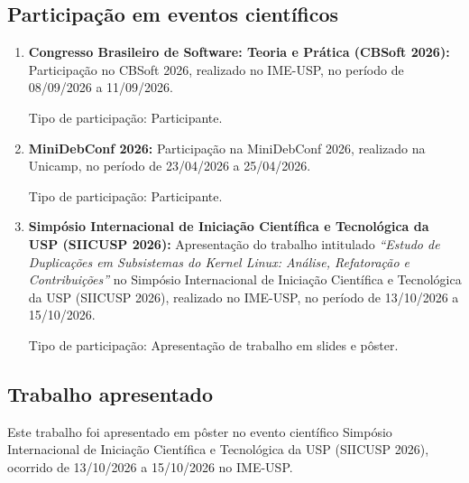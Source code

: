 \documentclass[oneside]{abntlatex}
\begin{document}
\begin{appendixenv}

\section{Participação em eventos científicos}\label{apx:participacao-em-eventos-cientificos}

\begingroup
\renewcommand{\labelenumi}{(\alph{enumi})}
\begin{enumerate}
    \item \textbf{Congresso Brasileiro de Software: Teoria e Prática (CBSoft 2026):} Participação no CBSoft 2026, realizado no IME-USP, no período de 08/09/2026 a 11/09/2026.

    Tipo de participação: Participante.

    \item \textbf{MiniDebConf 2026:} Participação na MiniDebConf 2026, realizado na Unicamp, no período de 23/04/2026 a 25/04/2026.

    Tipo de participação: Participante.

    \item \textbf{Simpósio Internacional de Iniciação Científica e Tecnológica da USP (SIICUSP 2026):} Apresentação do trabalho intitulado \textit{``Estudo de Duplicações em Subsistemas do Kernel Linux: Análise, Refatoração e Contribuições''} no Simpósio Internacional de Iniciação Científica e Tecnológica da USP (SIICUSP 2026), realizado no IME-USP, no período de 13/10/2026 a 15/10/2026.

    Tipo de participação: Apresentação de trabalho em slides e pôster.
\end{enumerate}
\endgroup

\subsection{Trabalho apresentado}

Este trabalho foi apresentado em pôster no evento científico Simpósio Internacional de Iniciação Científica e Tecnológica da USP (SIICUSP 2026), ocorrido de 13/10/2026 a 15/10/2026 no IME-USP.




\end{appendixenv}
\end{document}
